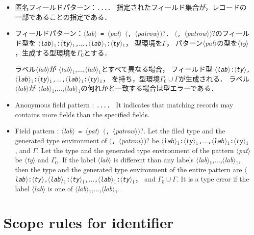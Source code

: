 \documentclass{jbook}
\newcommand{\txt}[2]{#2}
\newcommand{\code}[1]{\mbox{\large\tt #1}}
\newcommand{\nonterm}[1]{\mbox{$\langle$}{\it #1}\mbox{$\rangle$}}
\newcommand{\term}[1]{\mbox{{\tt #1}}}
\newcommand{\optional}[1]{\mbox{$($}{\protect #1}\mbox{$)?$}}
\newcommand{\ass}{\Gamma}
\begin{document}
\ifjp%
\begin{itemize}
\item 匿名フィールドパターン：\term{...}．
	指定されたフィールド集合が，レコードの一部であることの指定である．
\item フィールドパターン：\nonterm{lab}\ \term{=}\ \nonterm{pat}\ \optional{\term{,}\ \nonterm{patrow}}．
	\optional{\term{,}\ \nonterm{patrow}}のフィールド型を
\code{\nonterm{lab}$_1$:\nonterm{ty}$_1$,$\ldots$,\nonterm{lab}$_1$:\nonterm{ty}$_1$}，
型環境を$\ass$，
パターン\nonterm{pat}の型を\nonterm{ty}，生成する型環境を$\ass_0$とする．

	ラベル\nonterm{lab}が
\nonterm{lab}$_1$,$\ldots$,\nonterm{lab}$_1$とすべて異なる場合，
フィールド型
\code{\nonterm{lab}:\nonterm{ty},\nonterm{lab}$_1$:\nonterm{ty}$_1$,$\ldots$,\nonterm{lab}$_1$:\nonterm{ty}$_1$}，
を持ち，型環境$\ass_0 \cup \ass$が生成される．
	ラベル\nonterm{lab}が
\nonterm{lab}$_1$,$\ldots$,\nonterm{lab}$_1$の何れかと一致する場合は型エラーである．
\end{itemize}	
\else%
\begin{itemize}
\item Anonymous field pattern : \term{...}．
	It indicates that matching records may contains more fields than
the specified fields.
\item Field pattern : \nonterm{lab}\ \term{=}\ \nonterm{pat}\ \optional{\term{,}\ \nonterm{patrow}}.
	Let the filed type and the generated type environment of \optional{\term{,}\ \nonterm{patrow}} be
\code{\nonterm{lab}$_1$:\nonterm{ty}$_1$,$\ldots$,\nonterm{lab}$_1$:\nonterm{ty}$_1$},
and $\ass$.
	Let the type and the generated type environment of the pattern \nonterm{pat} be \nonterm{ty}
and  $\ass_0$.
	If the label \nonterm{lab} is different than any labels
\nonterm{lab}$_1$,$\ldots$,\nonterm{lab}$_1$, 
then the type and the generated type environment of the entire pattern
are  
\code{\nonterm{lab}:\nonterm{ty},\nonterm{lab}$_1$:\nonterm{ty}$_1$,$\ldots$,\nonterm{lab}$_1$:\nonterm{ty}$_1$}，
and $\ass_0 \cup \ass$.
	It is a type error if the label \nonterm{lab} is one of 
\nonterm{lab}$_1$,$\ldots$,\nonterm{lab}$_1$.
\end{itemize}	
\fi%

\chapter{\txt{識別子のスコープ規則}{Scope rules for identifier}}
\label{sce:scopeRule}
\end{document}
